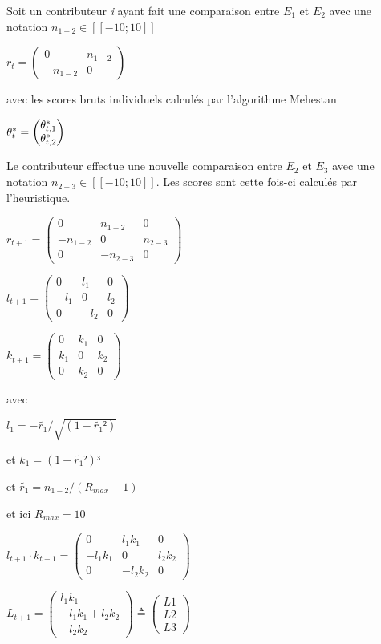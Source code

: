 Soit un contributeur \textit{i} ayant fait une comparaison entre $E_{1}$ et $E_{2}$ avec une notation $n_{1-2} \in [\![-10;10]\!]$


$r_{t}= \begin{pmatrix}
0 & n_{1-2} \\
-n_{1-2} & 0 
\end{pmatrix}$

avec les scores bruts individuels calculés par l'algorithme Mehestan

$\theta^*_{t}= \begin{pmatrix}
\theta^*_{t,1} \\
\theta^*_{t,2} 
\end{pmatrix}$

Le contributeur effectue une nouvelle comparaison entre $E_{2}$ et $E_{3}$ avec une notation $n_{2-3} \in [\![-10;10]\!]$. Les scores sont cette fois-ci calculés par l'heuristique.

$r_{t+1}= \begin{pmatrix}
0 & n_{1-2} & 0\\
-n_{1-2} & 0 & n_{2-3}\\
0 & -n_{2-3} & 0
\end{pmatrix}$

$l_{t+1}= \begin{pmatrix}
0 & l_1 & 0\\
-l_1 & 0 & l_2\\
0 & -l_2 & 0
\end{pmatrix}
$

$k_{t+1}= \begin{pmatrix}
0 & k_1 & 0\\
k_1 & 0 & k_2\\
0 & k_2 & 0
\end{pmatrix}
$

avec 

$l_1= -\tilde{r_1}/\sqrt{(1-\tilde{r_1}²)}$

et $k_1= (1-\tilde{r_1}²)³ $

et $\tilde{r_1} = n_{1-2}/(R_{max}+1)$

et ici $R_{max}=10$

$l_{t+1} \cdot k_{t+1}= \begin{pmatrix}
0 & l_1 k_1 & 0\\
-l_1 k_1 & 0 & l_2 k_2\\
0 & -l_2 k_2 & 0
\end{pmatrix}
$

$L_{t+1}= \begin{pmatrix}
l_1 k_1\\
-l_1 k_1 +l_2 k_2\\
-l_2 k_2
\end{pmatrix} \triangleq
\begin{pmatrix}
L1\\
L2\\
L3
\end{pmatrix} 
$

